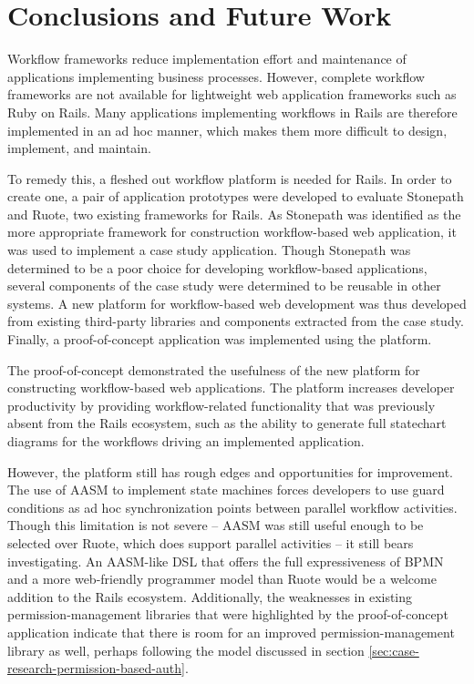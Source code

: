 \documentclass[document.tex]{subfiles}
\begin{document}
\chapter{Conclusions and Future Work}
\label {ch:conclusion}

Workflow frameworks reduce implementation effort and maintenance of applications implementing business processes. However, complete workflow frameworks are not available for lightweight web application frameworks such as Ruby on Rails. Many applications implementing workflows in Rails are therefore implemented in an ad hoc manner, which makes them more difficult to design, implement, and maintain.

To remedy this, a fleshed out workflow platform is needed for Rails. In order to create one, a pair of application prototypes were developed to evaluate Stonepath and Ruote, two existing frameworks for Rails. As Stonepath was identified as the more appropriate framework for construction workflow-based web application, it was used to implement a case study application. Though Stonepath was determined to be a poor choice for developing workflow-based applications, several components of the case study were determined to be reusable in other systems. A new platform for workflow-based web development was thus developed from existing third-party libraries and components extracted from the case study. Finally, a proof-of-concept application was implemented using the platform.

The proof-of-concept demonstrated the usefulness of the new platform for constructing workflow-based web applications. The platform increases developer productivity by providing workflow-related functionality that was previously absent from the Rails ecosystem, such as the ability to generate full statechart diagrams for the workflows driving an implemented application. 

However, the platform still has rough edges and opportunities for improvement. The use of AASM to implement state machines forces developers to use guard conditions as ad hoc synchronization points between parallel workflow activities. Though this limitation is not severe -- AASM was still useful enough to be selected over Ruote, which does support parallel activities -- it still bears investigating. An AASM-like DSL that offers the full expressiveness of BPMN and a more web-friendly programmer model than Ruote would be a welcome addition to the Rails ecosystem. Additionally, the weaknesses in existing permission-management libraries that were highlighted by the proof-of-concept application indicate that there is room for an improved permission-management library as well, perhaps following the model discussed in section \ref{sec:case-research-permission-based-auth}.
\end{document}
